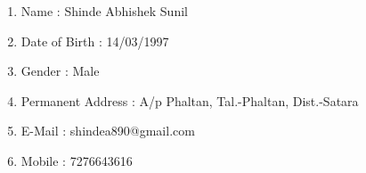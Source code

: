 \documentclass[11pt,fleqn]{book} %
\begin{document}
\newpage
\begin{enumerate}
\begingroup
\thispagestyle{empty}
\par\normalfont\fontsize{20}{15}\sffamily\selectfont\color{white}
\vspace*{2cm}
    \item Name : Shinde Abhishek Sunil\\[0.5cm]
    \item Date of Birth : 14/03/1997\\[0.5cm]
    \item Gender : Male\\[0.5cm] 
    \item Permanent Address : A/p Phaltan, Tal.-Phaltan, Dist.-Satara\\[0.5cm]
    \item E-Mail : shindea890@gmail.com\\[0.5cm]
    \item Mobile : 7276643616
\end{enumerate}
\endgroup
\end{document}
